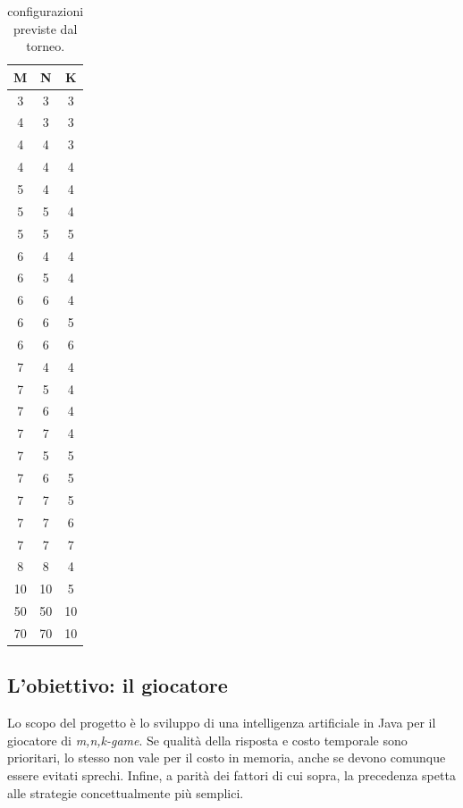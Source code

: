 \documentclass{article}
\begin{document}
\begin{table}[h!]
\centering
\begin{tabular}{ | c | c | c | }
  \hline
  M & N & K \\
  \hline
  3 & 3 & 3 \\
  \hline
  4 & 3 & 3 \\
  \hline
  4 & 4 & 3 \\
  \hline
  4 & 4 & 4 \\
  \hline
  5 & 4 & 4 \\
  \hline
  5 & 5 & 4 \\
  \hline
  5 & 5 & 5 \\
  \hline
  6 & 4 & 4 \\
  \hline
  6 & 5 & 4 \\
  \hline
  6 & 6 & 4 \\
  \hline
  6 & 6 & 5 \\
  \hline
  6 & 6 & 6 \\
  \hline
  7 & 4 & 4 \\
  \hline
  7 & 5 & 4 \\
  \hline
  7 & 6 & 4 \\
  \hline
  7 & 7 & 4 \\
  \hline
  7 & 5 & 5 \\
  \hline
  7 & 6 & 5 \\
  \hline
  7 & 7 & 5 \\
  \hline
  7 & 7 & 6 \\
  \hline
  7 & 7 & 7 \\
  \hline
  8 & 8 & 4 \\
  \hline
  10 & 10 & 5 \\
  \hline
  50 & 50 & 10 \\
  \hline
  70 & 70 & 10 \\
  \hline
\end{tabular}
  \caption{configurazioni previste dal torneo.}
  \label{table:1}
\end{table}

\subsection{L'obiettivo: il giocatore}

Lo scopo del progetto è lo sviluppo di una intelligenza artificiale in Java
per il giocatore di \emph{m,n,k-game}. Se qualità della risposta e costo
temporale sono prioritari, lo stesso non vale per il costo in memoria, anche se
devono comunque essere evitati sprechi. Infine, a parità dei fattori di cui
sopra, la precedenza spetta alle strategie concettualmente più semplici.
\end{document}
